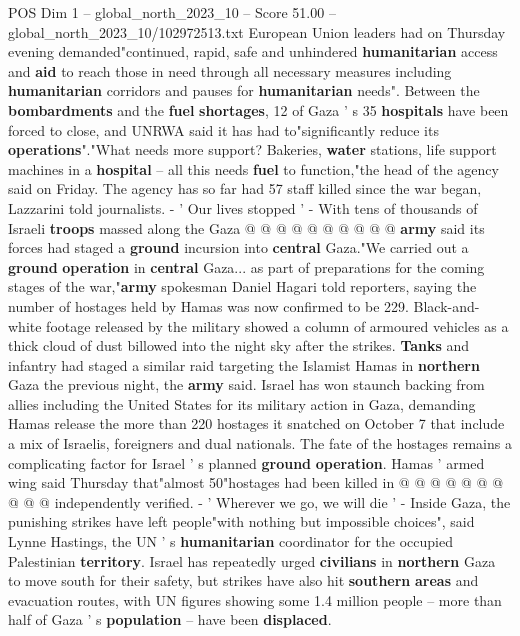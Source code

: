 \begin{textsample}{POS Dim 1 – global\_north\_2023\_10 – Score 51.00 – global\_north\_2023\_10/102972513.txt}
European Union leaders had on Thursday evening demanded"continued, rapid, safe and unhindered \textbf{humanitarian} access and \textbf{aid} to reach those in need through all necessary measures including \textbf{humanitarian} corridors and pauses for \textbf{humanitarian} needs".
Between the \textbf{bombardments} and the \textbf{fuel} \textbf{shortages}, 12 of Gaza ' s 35 \textbf{hospitals} have been forced to close, and UNRWA said it has had to"significantly reduce its \textbf{operations}"."What needs more support?
Bakeries, \textbf{water} stations, life support machines in a \textbf{hospital} -- all this needs \textbf{fuel} to function,"the head of the agency said on Friday.
The agency has so far had 57 staff killed since the war began, Lazzarini told journalists. - ' Our lives stopped ' - With tens of thousands of Israeli \textbf{troops} massed along the Gaza @ @ @ @ @ @ @ @ @ @ \textbf{army} said its forces had staged a \textbf{ground} incursion into \textbf{central} Gaza."We carried out a \textbf{ground} \textbf{operation} in \textbf{central} Gaza... as part of preparations for the coming stages of the war,"\textbf{army} spokesman Daniel Hagari told reporters, saying the number of hostages held by Hamas was now confirmed to be 229.
Black-and-white footage released by the military showed a column of armoured vehicles as a thick cloud of dust billowed into the night sky after the strikes. \textbf{Tanks} and infantry had staged a similar raid targeting the Islamist Hamas in \textbf{northern} Gaza the previous night, the \textbf{army} said.
Israel has won staunch backing from allies including the United States for its military action in Gaza, demanding Hamas release the more than 220 hostages it snatched on October 7 that include a mix of Israelis, foreigners and dual nationals.
The fate of the hostages remains a complicating factor for Israel ' s planned \textbf{ground} \textbf{operation}.
Hamas ' armed wing said Thursday that"almost 50"hostages had been killed in @ @ @ @ @ @ @ @ @ @ independently verified. - ' Wherever we go, we will die ' - Inside Gaza, the punishing strikes have left people"with nothing but impossible choices", said Lynne Hastings, the UN ' s \textbf{humanitarian} coordinator for the occupied Palestinian \textbf{territory}.
Israel has repeatedly urged \textbf{civilians} in \textbf{northern} Gaza to move south for their safety, but strikes have also hit \textbf{southern} \textbf{areas} and evacuation routes, with UN figures showing some 1.4 million people -- more than half of Gaza ' s \textbf{population} -- have been \textbf{displaced}.

\end{textsample}
